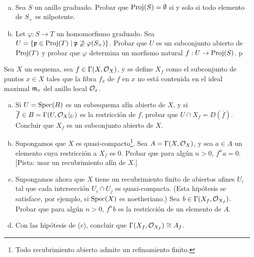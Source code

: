 \documentclass[twoside]{article}
\begin{document}
\begin{ejercicio}{2.14}\
\begin{enumerate}[(a)]
\item Sea $S$ un anillo graduado. Probar que $\operatorname{Proj}(S)=\emptyset$ si y solo si todo elemento de $S_+$ es nilpotente.
\item Let $\varphi:S\to T$ un homomorfismo graduado. Sea $U=\{\mathfrak{p}\in\operatorname{Proj}(T)\mid \mathfrak{p}\not\supseteq\varphi(S_+)\}$. Probar que $U$ es un subconjunto abierto de $\operatorname{Proj}(T)$ y probar que $\varphi$ determina un morfismo natural $f:U\to \operatorname{Proj}(S)$. p
\end{enumerate}
\end{ejercicio}
\begin{solucion}
\end{solucion}
%
\newpage
%
\begin{ejercicio}{2.16}
Sea $X$ un esquema, sea $f\in\Gamma(X,{\mathcal O}_X)$, y se define $X_f$ como el subconjunto de puntos $x\in X$ tales que la fibra $f_x$ de $f$ en $x$ no está contenida en el ideal maximal $\mathfrak{m}_x$ del anillo local ${\mathcal O}_{x}$. 
\begin{enumerate}[(a)]
\item Si $U=\operatorname{Spec}(B)$ es un subesquema afín abierto de $X$, y si $\overline{f}\in B=\Gamma(U,{\mathcal O}_X|_U)$ es la restricción de $f$, probar que $U\cap X_f=D(\overline{f})$. Concluir que $X_f$ es un subconjunto abierto de $X$. 
\item Supongamos que $X$ es quasi-compacto\footnote{Todo recubrimiento abierto admite un refinamiento finito.}. Sea $A=\Gamma(X,{\mathcal O}_X)$, y sea $a\in A$ un elemento cuya restricción a $X_f$ es 0. Probar que para algún $n>0$, $f^na=0$. [Pista: usar un recubrimiento afín de $X$.]
\item Supongamos ahora que $X$ tiene un recubrimiento finito de abiertos afines $U_i$ tal que cada intersección $U_i\cap U_j$ es quasi-compacta. (Esta hipótesis se satisface, por ejemplo, si $\operatorname{Spec}(X)$ es noetheriano.) Sea $b\in\Gamma(X_f,{\mathcal O}_{X_f})$. Probar que para algún $n>0$, $f^nb$ es la restricción de un elemento de $A$.
\item Con las hipótesis de (c), concluir que $\Gamma(X_f,{\mathcal O}_{X_f})\cong A_f$.
\end{enumerate}
\end{ejercicio}
\end{document}
